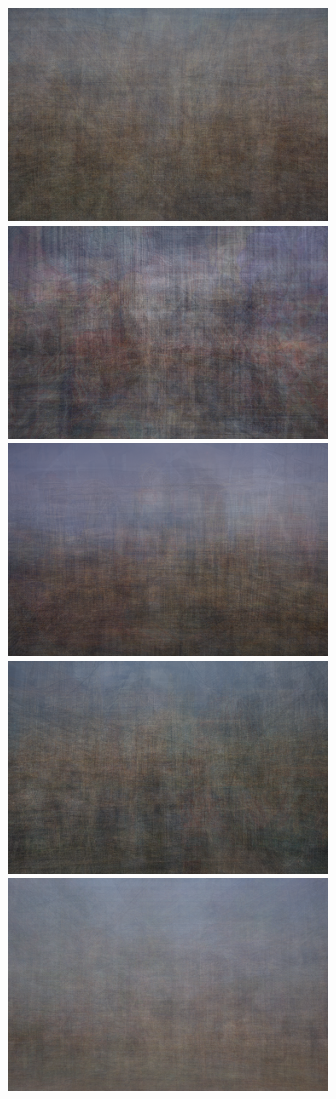 \documentclass[letterpaper,12pt]{article}
\begin{document}
\begin{figure}
	\centering
	\includegraphics[scale=0.4]{../Output/nyc-amalgamation.png}
	\includegraphics[scale=0.4]{../Output/boston-amalgamation.png}
	\includegraphics[scale=0.4]{../Output/seattle-amalgamation.png}
	\includegraphics[scale=0.4]{../Output/chicago-amalgamation.png}
	\includegraphics[scale=0.4]{../Output/seoul-amalgamation.png}

\end{figure}
\end{document}
